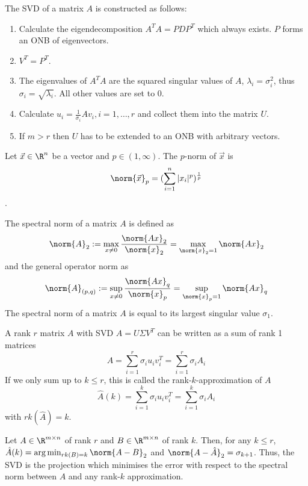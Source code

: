 The SVD of a matrix $A$ is constructed as follows:

\begin{enumerate}
    \item Calculate the eigendecomposition $A^T A = P D P^T$ which always exists.
    $P$ forms an ONB of eigenvectors.
    \item $V^T = P^T$.
    \item The eigenvalues of $A^T A$ are the squared singular values of $A$,
    $\lambda_i = \sigma_i^2$, thus $\sigma_i = \sqrt{\lambda_i}$.
    All other values are set to $0$.
    \item Calculate $u_i = \frac{1}{\sigma_i} A v_i, i = 1, \dotsc, r$
    and collect them into the matrix $U$.
    \item If $m > r$ then $U$ has to be extended to an ONB with arbitrary vectors.
\end{enumerate}

Let $\vec{x} \in \R^n$ be a vector and $p \in (1, \infty)$.
The $p$-norm of $\vec{x}$ is
\begin{equation*}
    \norm{\vec{x}}_p = (\sum_{i = 1}^n{|x_i|^p})^\frac{1}{p}
\end{equation*}.

The spectral norm of a matrix $A$ is defined as
\begin{equation*}
    \norm{A}_2 := \max_{x \neq 0}{\frac{\norm{Ax}_2}{\norm{x}_2}} = \max_{\norm{x}_2 = 1}{\norm{Ax}_2}
\end{equation*}
and the general operator norm as
\begin{equation*}
    \norm{A}_{(p,q)} :=
    \sup_{x \neq 0}{\frac{\norm{Ax}_q}{\norm{x}_p}} = \sup_{\norm{x}_p = 1}{\norm{Ax}_q}
\end{equation*}
The spectral norm of a matrix $A$ is equal to its largest singular value $\sigma_1$.

A rank $r$ matrix $A$ with SVD $A = U \Sigma V^T$ can be written as a sum of rank 1 matrices
\begin{equation*}
    A = \sum_{i=1}^r{\sigma_i u_i v_i^T} = \sum_{i=1}^r{\sigma_i A_i}
\end{equation*}
If we only sum up to $k \leq r$, this is called the rank-$k$-approximation of $A$
\begin{equation*}
    \hat{A}(k) = \sum_{i=1}^k{\sigma_i u_i v_i^T} = \sum_{i=1}^k{\sigma_i A_i}
\end{equation*}
with $rk(\hat{A}) = k$.

Let $A \in \R^{m \times n}$ of rank $r$ and
$B \in \R^{m \times n}$ of rank $k$.
Then, for any $k \leq r$,
$\hat{A}(k) = \arg\min_{rk(B) = k}\norm{A - B}_2$ and
$\norm{A - \hat{A}}_2 = \sigma_{k + 1}$.
Thus, the SVD is the projection which minimises the error with respect to the spectral norm
between $A$ and any rank-$k$ approximation.
